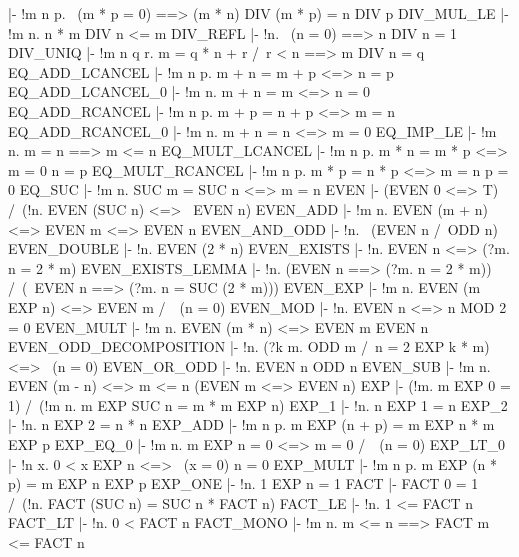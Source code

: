   |- !m n p. ~(m * p = 0) ==> (m * n) DIV (m * p) = n DIV p
\ENDTHEOREM
\THEOREM DIV\_MUL\_LE
  |- !m n. n * m DIV n <= m
\ENDTHEOREM
\THEOREM DIV\_REFL
  |- !n. ~(n = 0) ==> n DIV n = 1
\ENDTHEOREM
\THEOREM DIV\_UNIQ
  |- !m n q r. m = q * n + r /\ r < n ==> m DIV n = q
\ENDTHEOREM
\THEOREM EQ\_ADD\_LCANCEL
  |- !m n p. m + n = m + p <=> n = p
\ENDTHEOREM
\THEOREM EQ\_ADD\_LCANCEL\_0
  |- !m n. m + n = m <=> n = 0
\ENDTHEOREM
\THEOREM EQ\_ADD\_RCANCEL
  |- !m n p. m + p = n + p <=> m = n
\ENDTHEOREM
\THEOREM EQ\_ADD\_RCANCEL\_0
  |- !m n. m + n = n <=> m = 0
\ENDTHEOREM
\THEOREM EQ\_IMP\_LE
  |- !m n. m = n ==> m <= n
\ENDTHEOREM
\THEOREM EQ\_MULT\_LCANCEL
  |- !m n p. m * n = m * p <=> m = 0 \/ n = p
\ENDTHEOREM
\THEOREM EQ\_MULT\_RCANCEL
  |- !m n p. m * p = n * p <=> m = n \/ p = 0
\ENDTHEOREM
\THEOREM EQ\_SUC
  |- !m n. SUC m = SUC n <=> m = n
\ENDTHEOREM
\THEOREM EVEN
  |- (EVEN 0 <=> T) /\ (!n. EVEN (SUC n) <=> ~EVEN n)
\ENDTHEOREM
\THEOREM EVEN\_ADD
  |- !m n. EVEN (m + n) <=> EVEN m <=> EVEN n
\ENDTHEOREM
\THEOREM EVEN\_AND\_ODD
  |- !n. ~(EVEN n /\ ODD n)
\ENDTHEOREM
\THEOREM EVEN\_DOUBLE
  |- !n. EVEN (2 * n)
\ENDTHEOREM
\THEOREM EVEN\_EXISTS
  |- !n. EVEN n <=> (?m. n = 2 * m)
\ENDTHEOREM
\THEOREM EVEN\_EXISTS\_LEMMA
  |- !n. (EVEN n ==> (?m. n = 2 * m)) /\ (~EVEN n ==> (?m. n = SUC (2 * m)))
\ENDTHEOREM
\THEOREM EVEN\_EXP
  |- !m n. EVEN (m EXP n) <=> EVEN m /\ ~(n = 0)
\ENDTHEOREM
\THEOREM EVEN\_MOD
  |- !n. EVEN n <=> n MOD 2 = 0
\ENDTHEOREM
\THEOREM EVEN\_MULT
  |- !m n. EVEN (m * n) <=> EVEN m \/ EVEN n
\ENDTHEOREM
\THEOREM EVEN\_ODD\_DECOMPOSITION
  |- !n. (?k m. ODD m /\ n = 2 EXP k * m) <=> ~(n = 0)
\ENDTHEOREM
\THEOREM EVEN\_OR\_ODD
  |- !n. EVEN n \/ ODD n
\ENDTHEOREM
\THEOREM EVEN\_SUB
  |- !m n. EVEN (m - n) <=> m <= n \/ (EVEN m <=> EVEN n)
\ENDTHEOREM
\THEOREM EXP
  |- (!m. m EXP 0 = 1) /\ (!m n. m EXP SUC n = m * m EXP n)
\ENDTHEOREM
\THEOREM EXP\_1
  |- !n. n EXP 1 = n
\ENDTHEOREM
\THEOREM EXP\_2
  |- !n. n EXP 2 = n * n
\ENDTHEOREM
\THEOREM EXP\_ADD
  |- !m n p. m EXP (n + p) = m EXP n * m EXP p
\ENDTHEOREM
\THEOREM EXP\_EQ\_0
  |- !m n. m EXP n = 0 <=> m = 0 /\ ~(n = 0)
\ENDTHEOREM
\THEOREM EXP\_LT\_0
  |- !n x. 0 < x EXP n <=> ~(x = 0) \/ n = 0
\ENDTHEOREM
\THEOREM EXP\_MULT
  |- !m n p. m EXP (n * p) = m EXP n EXP p
\ENDTHEOREM
\THEOREM EXP\_ONE
  |- !n. 1 EXP n = 1
\ENDTHEOREM
\THEOREM FACT
  |- FACT 0 = 1 /\ (!n. FACT (SUC n) = SUC n * FACT n)
\ENDTHEOREM
\THEOREM FACT\_LE
  |- !n. 1 <= FACT n
\ENDTHEOREM
\THEOREM FACT\_LT
  |- !n. 0 < FACT n
\ENDTHEOREM
\THEOREM FACT\_MONO
  |- !m n. m <= n ==> FACT m <= FACT n
\ENDTHEOREM

